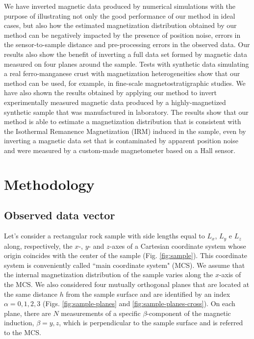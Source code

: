 \documentclass[draft,gc]{agutex}
\begin{document}
\begin{article}
We have inverted magnetic data produced by
numerical simulations with the purpose of illustrating not only the 
good performance of our method in ideal cases, but also how
the estimated magnetization distribution obtained by our
method can be negatively impacted by the presence of position 
noise, errors in the sensor-to-sample distance and 
pre-processing errors in the observed data.
Our results also show the benefit of inverting a full data set
formed by magnetic data measured on four planes around the sample.
Tests with synthetic data simulating a real ferro-manganese
crust with magnetization heterogeneities show that our method 
can be used, for example, in fine-scale magnetostratigraphic 
studies.
We have also shown the results obtained by applying our method
to invert experimentally measured magnetic data produced by
a highly-magnetized synthetic sample that was manufactured in 
laboratory.
The results show that our method is able to estimate a magnetization
distribution that is consistent with the Isothermal Remanence 
Magnetization (IRM) induced in the
sample, even by inverting a magnetic data set that is contaminated 
by apparent position noise and were measured by a
custom-made magnetometer based on a Hall sensor.

\section{Methodology}
\label{sec:Methodology}

\subsection{Observed data vector}
\label{subsec:Observed data vector}


Let's consider a rectangular rock sample with side lengths equal 
to $L_{x}$, $L_{y}$ e $L_{z}$ along, respectively, the $x$-, $y$- and 
$z$-axes of a Cartesian coordinate system 
whose origin coincides with the center of the sample 
(Fig. \ref{fig:sample}). 
This coordinate system is conveniently called 
``main coordinate system" (MCS).
We assume that the internal magnetization distribution of the sample
varies along the $x$-axis of the MCS.
We also considered four mutually orthogonal planes that are located 
at the same distance $h$ from the sample surface and are identified 
by an index $\alpha = 0, 1, 2, 3$
(Figs. \ref{fig:sample-planes} and \ref{fig:sample-planes-cross}).
On each plane, there are $N$ measurements of a specific 
$\beta$-component of the magnetic induction, $\beta = y, z$, 
which is perpendicular to the sample surface and is referred
to the MCS.


\end{article}
\end{document}
